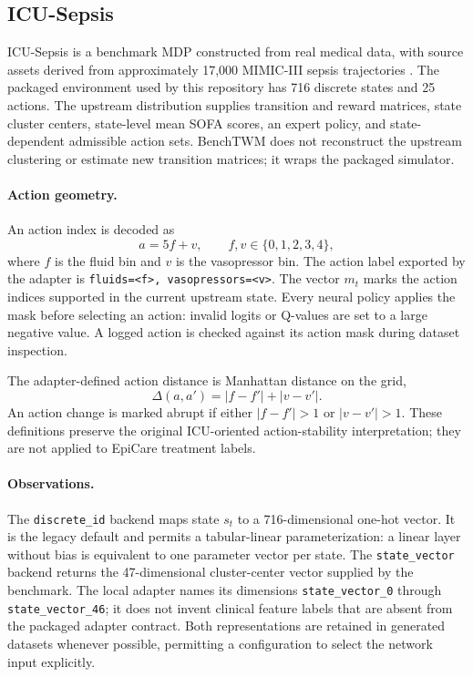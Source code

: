 \documentclass[10pt,twocolumn]{article}
\newcommand{\code}[1]{\texttt{#1}}
\begin{document}
\subsection{ICU-Sepsis}
\label{sec:icu}

ICU-Sepsis is a benchmark MDP constructed from real medical data, with source assets derived from approximately 17,000 MIMIC-III sepsis trajectories \cite{choudhary2024icu}. The packaged environment used by this repository has 716 discrete states and 25 actions. The upstream distribution supplies transition and reward matrices, state cluster centers, state-level mean SOFA scores, an expert policy, and state-dependent admissible action sets. BenchTWM does not reconstruct the upstream clustering or estimate new transition matrices; it wraps the packaged simulator.

\paragraph{Action geometry.}
An action index is decoded as
\begin{equation}
    a = 5f + v, \qquad f,v \in \{0,1,2,3,4\},
\end{equation}
where $f$ is the fluid bin and $v$ is the vasopressor bin. The action label exported by the adapter is \code{fluids=<f>, vasopressors=<v>}. The vector $m_t$ marks the action indices supported in the current upstream state. Every neural policy applies the mask before selecting an action: invalid logits or Q-values are set to a large negative value. A logged action is checked against its action mask during dataset inspection.

The adapter-defined action distance is Manhattan distance on the grid,
\begin{equation}
    \Delta(a,a') = |f-f'| + |v-v'|.
\end{equation}
An action change is marked abrupt if either $|f-f'|>1$ or $|v-v'|>1$. These definitions preserve the original ICU-oriented action-stability interpretation; they are not applied to EpiCare treatment labels.

\paragraph{Observations.}
The \code{discrete\_id} backend maps state $s_t$ to a 716-dimensional one-hot vector. It is the legacy default and permits a tabular-linear parameterization: a linear layer without bias is equivalent to one parameter vector per state. The \code{state\_vector} backend returns the 47-dimensional cluster-center vector supplied by the benchmark. The local adapter names its dimensions \code{state\_vector\_0} through \code{state\_vector\_46}; it does not invent clinical feature labels that are absent from the packaged adapter contract. Both representations are retained in generated datasets whenever possible, permitting a configuration to select the network input explicitly.
\end{document}
